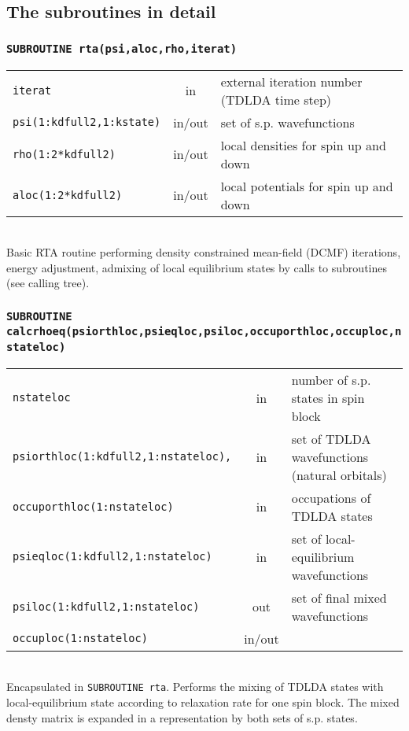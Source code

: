\documentclass[final,1p]{elsarticle}
\begin{document}
\subsection{The subroutines in detail}
\label{eq:details}

\subsubsection*{\tt SUBROUTINE rta(psi,aloc,rho,iterat)}
\begin{tabular}{lcl}
 {\tt iterat} & in & external iteration number (TDLDA time step)\\
 {\tt psi(1:kdfull2,1:kstate)} & in/out& set of s.p. wavefunctions\\
 {\tt rho(1:2*kdfull2)}& in/out & local densities for spin up and down\\
 {\tt aloc(1:2*kdfull2)} & in/out& local potentials for spin up and down\\
\end{tabular}
\\[4pt]
Basic RTA routine performing density constrained mean-field (DCMF)
iterations, energy adjustment, admixing of local equilibrium states by
calls to subroutines (see calling tree).



\subsubsection*{\tt SUBROUTINE calcrhoeq(psiorthloc,psieqloc,psiloc,occuporthloc,occuploc,nstateloc)}
\begin{tabular}{lcl}
 {\tt nstateloc} & in & number of s.p. states in spin block\\
 {\tt psiorthloc(1:kdfull2,1:nstateloc),} & in & set of TDLDA
 wavefunctions (natural orbitals)\\
 {\tt occuporthloc(1:nstateloc)} & in & occupations of TDLDA states\\
 {\tt psieqloc(1:kdfull2,1:nstateloc)} & in& set of local-equilibrium wavefunctions\\
 {\tt psiloc(1:kdfull2,1:nstateloc)} & out& set of final mixed wavefunctions\\
 {\tt occuploc(1:nstateloc)} & in/out & \\
\end{tabular}
\\[4pt]
Encapsulated in {\tt SUBROUTINE rta}. Performs the mixing of TDLDA
states with local-equilibrium state according to relaxation rate
for one spin block. The mixed densty matrix is expanded in a
representation by both sets of s.p. states. 
\end{document}
